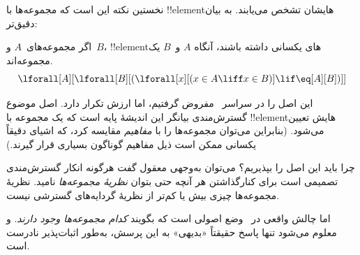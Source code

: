 \documentclass[../../../include/open-logic-section]{subfiles}
\begin{document}

نخستین نکته این است که مجموعه‌ها با !!{element}هایشان تشخص می‌یابند.
به بیان دقیق‌تر:

\begin{axiom}
اگر مجموعه‌های~$A$ و~$B$، !!{element}های یکسانی داشته باشند، آنگاه
$A$ و~$B$ یک مجموعه‌اند.
\[
  \lforall[A][\lforall[B][(\lforall[x][(x \in A \liff x \in B)] \lif
  \eq[A][B])]]
\]
\end{axiom}

این اصل را در سراسر~ مفروض گرفتیم، اما ارزش تکرار
دارد. اصل موضوع گسترش‌مندی بیانگر این اندیشهٔ پایه است که یک مجموعه با
!!{element}هایش تعیین می‌شود. (بنابراین می‌توان مجموعه‌ها را با
\emph{مفاهیم} مقایسه کرد، که اشیای دقیقاً یکسانی ممکن است ذیل مفاهیم
گوناگون بسیاری قرار گیرند.)

چرا باید این اصل را بپذیریم؟ می‌توان به‌وجهی معقول گفت هرگونه انکار
گسترش‌مندی تصمیمی است برای کنارگذاشتن هر آنچه حتی بتوان
\emph{نظریهٔ مجموعه‌ها} نامید. نظریهٔ مجموعه‌ها چیزی بیش یا کم‌تر از
نظریهٔ گردایه‌های گسترشی نیست.

اما چالش واقعی در~ وضع اصولی است که بگویند
\emph{کدام مجموعه‌ها وجود دارند}. و معلوم می‌شود تنها پاسخ حقیقتاً
«بدیهی» به این پرسش، به‌طور اثبات‌پذیر نادرست است.
\end{document}
